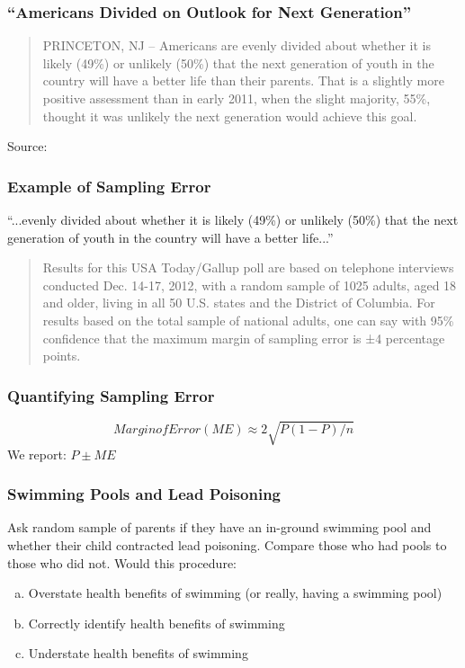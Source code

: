 \documentclass[handout]{beamer}
\begin{document}
\begin{frame}
\frametitle{``Americans Divided on Outlook for Next Generation''}
	\vspace{1em}
	\begin{quote}
		PRINCETON, NJ -- Americans are evenly divided about whether it is likely (49\%) or unlikely 			(50\%) that the next generation of youth in the country will have a better life than their 				parents. That is a slightly more positive assessment than in early 2011, when the slight 				majority, 55\%, thought it was unlikely the next generation would achieve this goal.
	\end{quote}
	\tiny{Source: \href{http://www.gallup.com/poll/159737/americans-divided-outlook-next-generation.aspx}{}}	
\end{frame}

\begin{frame}
\frametitle{Example of Sampling Error}
	``...evenly divided about whether it is likely (49\%) or unlikely (50\%) that the next generation 		of youth in the country will have a better life...''
	\vspace{2em}
	\begin{quote}
		Results for this USA Today/Gallup poll are based on telephone interviews conducted Dec. 			14-17, 2012, with a \alert{random sample of 1025 adults}, aged 18 and older, living in all 50 			U.S. states and the District of Columbia. For results based on the total sample of national 			adults, one can say with \alert{95\% confidence that the maximum margin of sampling 				error is ±4 percentage points}.
	\end{quote}
\end{frame}

\begin{frame}
\frametitle{Quantifying Sampling Error}
	$$Margin of Error (ME) \approx 2 \sqrt{P(1-P)/n}$$
	We report: $P \pm ME$
\end{frame}

\begin{frame}
\frametitle{Swimming Pools and Lead Poisoning}
	Ask random sample of parents if they have an in-ground swimming pool and whether their   			child contracted lead poisoning. Compare those who had pools to those who did not.
	\vspace{1em}
	Would this procedure:
		\begin{enumerate}[(a)]
			\item Overstate health benefits of swimming (or really, having a swimming pool)
			\item Correctly identify health benefits of swimming
			\item Understate health benefits of swimming
		\end{enumerate}
\end{frame}
\end{document}
